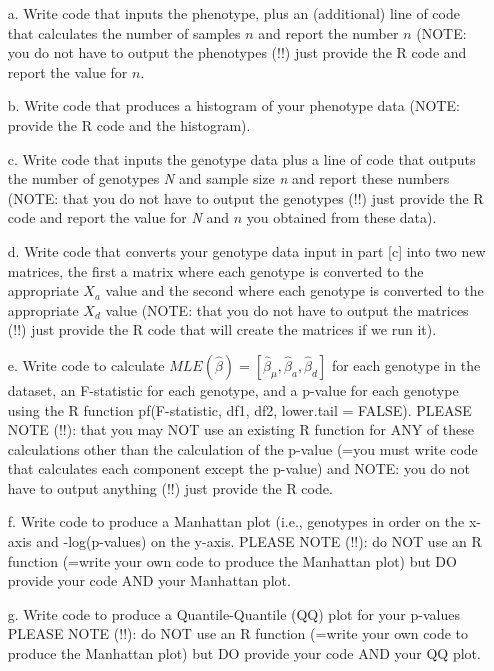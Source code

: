 \documentclass[letterpaper, 11pt]{article}
\begin{document}
\begin{itemize}

\item[a.]  Write code that inputs the phenotype, plus an (additional) line of code that calculates the number of samples $n$ and report the number $n$ (NOTE: you do not have to output the phenotypes (!!) just provide the R code and report the value for $n$.

\item[b.]  Write code that produces a histogram of your phenotype data (NOTE: provide the R code and the histogram).

\item[c.] Write code that inputs the genotype data plus a line of code that outputs the number of genotypes \textit{N} and sample size \textit{n} and report these numbers (NOTE: that you do not have to output the genotypes (!!) just provide the R code and report the value for \textit{N} and $n$ you obtained from these data).

\item[d.] Write code that converts your genotype data input in part [c] into two new matrices, the first a matrix where each genotype is converted to the appropriate $X_a$ value and the second where each genotype is converted to the appropriate $X_d$ value (NOTE: that you do not have to output the matrices (!!) just provide the R code that will create the matrices if we run it).

\item[e.] Write code to calculate $MLE(\hat{\beta}) = [\hat{\beta}_\mu, \hat{\beta}_a, \hat{\beta}_d]$ for each genotype in the dataset, an F-statistic for each genotype, and a p-value for each genotype using the R function pf(F-statistic, df1, df2, lower.tail = FALSE).   PLEASE NOTE (!!): that you may NOT use an existing R function for ANY of these calculations other than the calculation of the p-value (=you must write code that calculates each component except the p-value) and NOTE: you do not have to output anything (!!) just provide the R code.

\item[f.] Write code to produce a Manhattan plot (i.e., genotypes in order on the x-axis and -log(p-values) on the y-axis.  PLEASE NOTE (!!): do NOT use an R function (=write your own code to produce the Manhattan plot) but DO provide your code AND your Manhattan plot.

\item[g.] Write code to produce a Quantile-Quantile (QQ) plot for your p-values PLEASE NOTE (!!): do NOT use an R function (=write your own code to produce the Manhattan plot) but DO provide your code AND your QQ plot.


\end{itemize}
\end{document}
